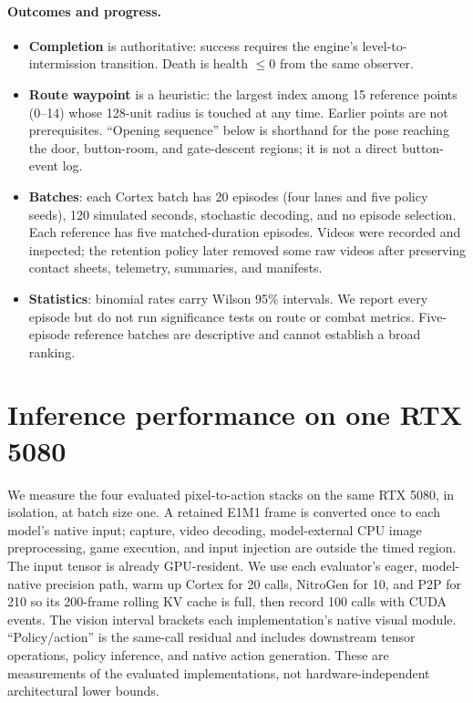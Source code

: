 \documentclass[11pt]{article}
\begin{document}
\paragraph{Outcomes and progress.}
\begin{itemize}
\item \textbf{Completion} is authoritative: success requires the engine's level-to-intermission transition. Death is health $\leq0$ from the same observer.
\item \textbf{Route waypoint} is a heuristic: the largest index among 15 reference points (0--14) whose 128-unit radius is touched at any time. Earlier points are not prerequisites. ``Opening sequence'' below is shorthand for the pose reaching the door, button-room, and gate-descent regions; it is not a direct button-event log.
\item \textbf{Batches}: each Cortex batch has 20 episodes (four lanes and five policy seeds), 120 simulated seconds, stochastic decoding, and no episode selection. Each reference has five matched-duration episodes. Videos were recorded and inspected; the retention policy later removed some raw videos after preserving contact sheets, telemetry, summaries, and manifests.
\item \textbf{Statistics}: binomial rates carry Wilson 95\% intervals. We report every episode but do not run significance tests on route or combat metrics. Five-episode reference batches are descriptive and cannot establish a broad ranking.
\end{itemize}

\section{Inference performance on one RTX 5080}\label{sec:latency}

We measure the four evaluated pixel-to-action stacks on the same RTX 5080, in isolation, at batch size one. A retained E1M1 frame is converted once to each model's native input; capture, video decoding, model-external CPU image preprocessing, game execution, and input injection are outside the timed region. The input tensor is already GPU-resident. We use each evaluator's eager, model-native precision path, warm up Cortex for 20 calls, NitroGen for 10, and P2P for 210 so its 200-frame rolling KV cache is full, then record 100 calls with CUDA events. The vision interval brackets each implementation's native visual module. ``Policy/action'' is the same-call residual and includes downstream tensor operations, policy inference, and native action generation. These are measurements of the evaluated implementations, not hardware-independent architectural lower bounds.
\end{document}
